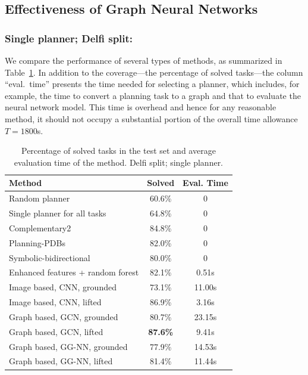 \documentclass[letterpaper]{article} %
\begin{document}
\subsection{Effectiveness of Graph Neural Networks}

\subsubsection{Single planner; Delfi split:} We compare the performance of several types of methods, as summarized in Table~\ref{tab:compare.baseline}.
In addition to the coverage---the percentage of solved tasks---the column ``eval.\ time'' presents the time needed for selecting a planner, which includes, for example, the time to convert a planning task to a graph and that to evaluate the neural network model. This time is overhead and hence for any reasonable method, it should not occupy a substantial portion of the overall time allowance $T=1800$s.


\begin{table}[ht]
\centering
\caption{Percentage of solved tasks in the test set and average evaluation time of the method. Delfi split; single planner.}
\label{tab:compare.baseline}
\begin{tabular}{lcc}
\hline
Method & Solved & Eval. Time \\
\hline
Random planner               & 60.6\% & 0 \\
Single planner for all tasks & 64.8\% & 0 \\
\hline
Complementary2               & 84.8\% & 0\\
Planning-PDBs                & 82.0\% & 0\\
Symbolic-bidirectional       & 80.0\% & 0\\
\hline
Enhanced features + random forest & 82.1\% & 0.51s\\
\hline
Image based, CNN, grounded   & 73.1\% & 11.00s \\
Image based, CNN, lifted     & 86.9\% & 3.16s \\
Graph based, GCN, grounded   & 80.7\% & 23.15s\\
Graph based, GCN, lifted     & \textbf{87.6\%} & 9.41s\\
Graph based, GG-NN, grounded & 77.9\% & 14.53s\\
Graph based, GG-NN, lifted   & 81.4\% & 11.44s\\
\hline
\end{tabular}
\end{table}
\end{document}
